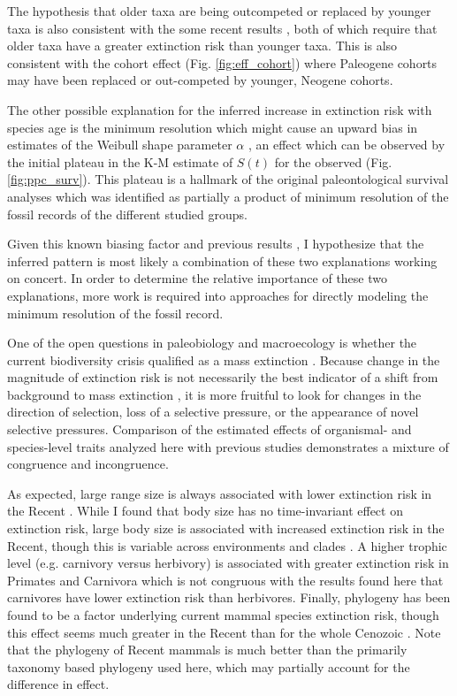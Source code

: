 \documentclass{nature}
\begin{document}
The hypothesis that older taxa are being outcompeted or replaced by younger taxa is also consistent with the some recent results \cite{Wagner2014b,Quental2013}, both of which require that older taxa have a greater extinction risk than younger taxa. This is also consistent with the cohort effect (Fig. \ref{fig:eff_cohort}) where Paleogene cohorts may have been replaced or out-competed by younger, Neogene cohorts.

The other possible explanation for the inferred increase in extinction risk with species age is the minimum resolution which might cause an upward bias in estimates of the Weibull shape parameter \(\alpha\) \cite{Sepkoski1975}, an effect which can be observed by the initial plateau in the K-M estimate of \(S(t)\) for the observed (Fig. \ref{fig:ppc_surv}). This plateau is a hallmark of the original paleontological survival analyses \cite{VanValen1973} which was identified as partially a product of minimum resolution of the fossil records of the different studied groups.

Given this known biasing factor and previous results \cite{Wagner2014b,Quental2013}, I hypothesize that the inferred pattern is most likely a combination of these two explanations working on concert. In order to determine the relative importance of these two explanations, more work is required into approaches for directly modeling the minimum resolution of the fossil record.

One of the open questions in paleobiology and macroecology is whether the current biodiversity crisis qualified as a mass extinction \cite{Alroy2010,Barnosky2011,Barnosky2012a}. Because change in the magnitude of extinction risk is not necessarily the best indicator of a shift from background to mass extinction \cite{Wang2003}, it is more fruitful to look for changes in the direction of selection, loss of a selective pressure, or the appearance of novel selective pressures. Comparison of the estimated effects of organismal- and species-level traits analyzed here with previous studies demonstrates a mixture of congruence and incongruence. 

As expected, large range size is always associated with lower extinction risk in the Recent \cite{Fritz2009,Fritz2010b,Liow2009,Purvis2000a}. While I found that body size has no time-invariant effect on extinction risk, large body size is associated with increased extinction risk in the Recent, though this is variable across environments and clades \cite{Liow2009,Fritz2009,Purvis2000a}. A higher trophic level (e.g. carnivory versus herbivory) is associated with greater extinction risk in Primates and Carnivora \cite{Purvis2000a} which is not congruous with the results found here that carnivores have lower extinction risk than herbivores. Finally, phylogeny has been found to be a factor underlying current mammal species extinction risk, though this effect seems much greater in the Recent than for the whole Cenozoic \cite{Fritz2010b}. Note that the phylogeny of Recent mammals is much better than the primarily taxonomy based phylogeny used here, which may partially account for the difference in effect.
\end{document}
